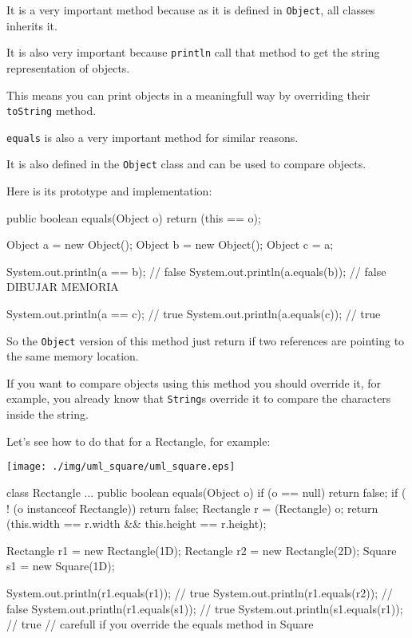 \documentclass[a4paper, 9pt]{extarticle}
\begin{document}
It is a very important method because as it is defined in \texttt{Object}, all
classes inherits it.

It is also very important because \texttt{println} call that method to get the
string representation of objects.

This means you can print objects in a meaningfull way by overriding their
\texttt{toString} method.

\texttt{equals} is also a very important method for similar reasons.

It is also defined in the \texttt{Object} class and can be used to compare
objects.

Here is its prototype and implementation:

\begin{blackboard}
  public boolean equals(Object o) {
    return (this == o);
  }

  Object a = new Object();
  Object b = new Object();
  Object c = a;

  System.out.println(a == b);      // false
  System.out.println(a.equals(b)); // false               DIBUJAR MEMORIA

  System.out.println(a == c);      // true
  System.out.println(a.equals(c)); // true
\end{blackboard}

So the \texttt{Object} version of this method just return if two references are
pointing to the same memory location.

If you want to compare objects using this method you should override it,
for example, you already know that \texttt{String}s override it to compare the
characters inside the string.

Let's see how to do that for a Rectangle, for example:

\begin{center}
  \texttt{[image: ./img/uml\_square/uml\_square.eps]}
\end{center}

\begin{blackboard}
class Rectangle {
  ...
  public boolean equals(Object o) {
    if (o == null) {
      return false;
    }
    if ( ! (o instanceof Rectangle)) {
      return false;
    }
    Rectangle r = (Rectangle) o;
    return (this.width == r.width && this.height == r.height);
  }
}

  Rectangle r1 = new Rectangle(1D);
  Rectangle r2 = new Rectangle(2D);
  Square s1 = new Square(1D);

  System.out.println(r1.equals(r1)); // true
  System.out.println(r1.equals(r2)); // false
  System.out.println(r1.equals(s1)); // true
  System.out.println(s1.equals(r1)); // true
  // carefull if you override the equals method in Square
\end{blackboard}
\end{document}
